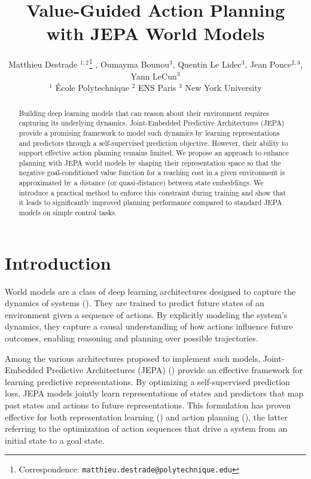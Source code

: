 \documentclass{article} %
\title{	
Value-Guided Action Planning with JEPA World Models}
\author{
Matthieu Destrade $^{1,2}$\thanks{Correspondence: \texttt{matthieu.destrade@polytechnique.edu}} ,
Oumayma Bounou$^{3}$,
Quentin Le Lidec$^{3}$,
Jean Ponce$^{2,3}$,
Yann LeCun$^{3}$ \\
$^{1}$ École Polytechnique \; $^{2}$ ENS Paris \; $^{3}$ New York University
}
\begin{document}
\maketitle
\vspace{-0.5cm}
\begin{abstract}
Building deep learning models that can reason about their environment requires capturing its underlying dynamics. Joint-Embedded Predictive Architectures (JEPA) provide a promising framework to model such dynamics by learning representations and predictors through a self-supervised prediction objective. However, their ability to support effective action planning remains limited. We propose an approach to enhance planning with JEPA world models by shaping their representation space so that the negative goal-conditioned value function for a reaching cost in a given environment is approximated by a distance (or quasi-distance) between state embeddings. We introduce a practical method to enforce this constraint during training and show that it leads to significantly improved planning performance compared to standard JEPA models on simple control tasks.
\end{abstract}

\section{Introduction}
World models are a class of deep learning architectures designed to capture the dynamics of systems (\cite{WM, ding2025understandingworldpredictingfuture}). They are trained to predict future states of an environment given a sequence of actions. By explicitly modeling the system’s dynamics, they capture a causal understanding of how actions influence future outcomes, enabling reasoning and planning over possible trajectories.

Among the various architectures proposed to implement such models, Joint-Embedded Predictive Architectures (JEPA) (\cite{LeCun2022APT}) provide an effective framework for learning predictive representations. By optimizing a self-supervised prediction loss, JEPA models jointly learn representations of states and predictors that map past states and actions to future representations. This formulation has proven effective for both representation learning (\cite{assran2023selfsupervisedlearningimagesjointembedding,bardes2024revisitingfeaturepredictionlearning}) and action planning (\cite{sobal2025learningrewardfreeofflinedata,zhou2025dinowmworldmodelspretrained}), the latter referring to the optimization of action sequences that drive a system from an initial state to a goal state.
\end{document}
